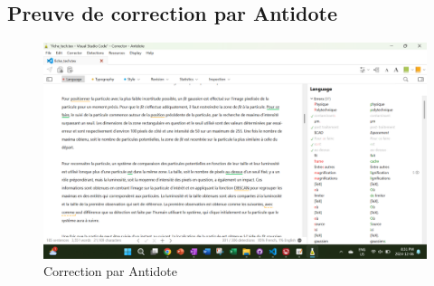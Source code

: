 \documentclass[11pt,letterpaper]{article}
\begin{document}
\subsection{Preuve de correction par Antidote}
\begin{figure}[H]
  \centering
  \includegraphics[scale=0.2]{Screenshot (1).png}
  \caption{Correction par Antidote}
\end{figure}
\clearpage
\end{document}

